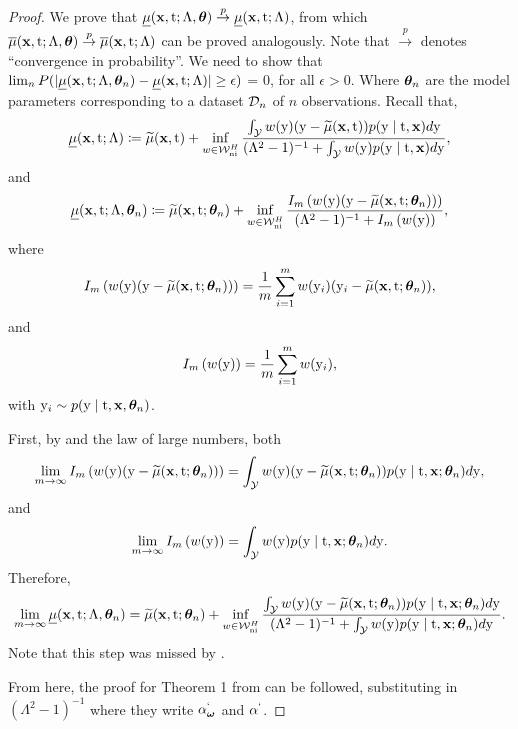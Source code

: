\begin{proof}
We prove that $\underline{\mu}(\mathbf{x}, \mathrm{t}; \Lambda, \bm{\theta}) \overset{p}{\to} \underline{\mu}(\mathbf{x}, \mathrm{t}; \Lambda)$, from which $\overline{\mu}(\mathbf{x}, \mathrm{t}; \Lambda, \bm{\theta}) \overset{p}{\to} \overline{\mu}(\mathbf{x}, \mathrm{t}; \Lambda)$ can be proved analogously. 
Note that $\overset{p}{\to}$ denotes ``convergence in probability''.
We need to show that $\lim_{n}P(| \underline{\mu}(\mathbf{x}, \mathrm{t}; \Lambda, \bm{\theta}_n) - \underline{\mu}(\mathbf{x}, \mathrm{t}; \Lambda) | \geq \epsilon)$ = 0, for all $\epsilon > 0$. 
Where $\bm{\theta}_n$ are the model parameters corresponding to a dataset $\mathcal{D}_n$ of $n$ observations.
Recall that,
\[
    \underline{\mu}(\mathbf{x}, \mathrm{t}; \Lambda) \coloneqq \widetilde{\mu}(\mathbf{x}, \mathrm{t}) + \inf_{w \in \mathcal{W}_{\textrm{ni}}^{H}} \frac{\int_{\mathcal{Y}} w(\mathrm{y}) (\mathrm{y} - \widetilde{\mu}(\mathbf{x}, \mathrm{t})) p(\mathrm{y} \mid \mathrm{t}, \mathbf{x})d\mathrm{y}}{(\Lambda^2 - 1)^{-1} + \int_{\mathcal{Y}} w(\mathrm{y})p(\mathrm{y} \mid \mathrm{t}, \mathbf{x})d\mathrm{y}},
\]
and
\[
    \underline{\mu}(\mathbf{x}, \mathrm{t}; \Lambda, \bm{\theta}_n) \coloneqq \widetilde{\mu}(\mathbf{x}, \mathrm{t}; \bm{\theta}_n) + \inf_{w \in \mathcal{W}_{\textrm{ni}}^{H}} \frac{I_m\left( w(\mathrm{y}) (\mathrm{y} - \widetilde{\mu}(\mathbf{x}, \mathrm{t}; \bm{\theta}_n)) \right)}{(\Lambda^2 - 1)^{-1} + I_m\left( w(\mathrm{y}) \right)},
\]
where 
\[
    I_m\left( w(\mathrm{y}) (\mathrm{y} - \widetilde{\mu}(\mathbf{x}, \mathrm{t}; \bm{\theta}_n)) \right) = \frac{1}{m}\sum_{i=1}^{m} w(\mathrm{y}_i) (\mathrm{y}_i - \widetilde{\mu}(\mathbf{x}, \mathrm{t}; \bm{\theta}_n)),
\] 
and 
\[
    I_m\left( w(\mathrm{y}) \right) = \frac{1}{m}\sum_{i=1}^{m} w(\mathrm{y}_i),
\]
with $\mathrm{y}_i \sim p(\mathrm{y} \mid \mathrm{t}, \mathbf{x}, \bm{\theta}_n)$.

First, by  and the law of large numbers, both
\[
    \lim_{m \to \infty} I_m\left( w(\mathrm{y}) (\mathrm{y} - \widetilde{\mu}(\mathbf{x}, \mathrm{t}; \bm{\theta}_n)) \right) = \int_{\mathcal{Y}} w(\mathrm{y})(\mathrm{y} - \widetilde{\mu}(\mathbf{x}, \mathrm{t}; \bm{\theta}_n))p(\mathrm{y} \mid \mathrm{t}, \mathbf{x}; \bm{\theta}_n)d\mathrm{y},
\]
and
\[
    \lim_{m \to \infty} I_m\left( w(\mathrm{y}) \right) = \int_{\mathcal{Y}} w(\mathrm{y})p(\mathrm{y} \mid \mathrm{t}, \mathbf{x}; \bm{\theta}_n)d\mathrm{y}.
\]
Therefore, 
\[
    \lim_{m \to \infty} \underline{\mu}(\mathbf{x}, \mathrm{t}; \Lambda, \bm{\theta}_n) = \widetilde{\mu}(\mathbf{x}, \mathrm{t}; \bm{\theta}_n) + \inf_{w \in \mathcal{W}_{\textrm{ni}}^{H}} \frac{\int_{\mathcal{Y}} w(\mathrm{y})(\mathrm{y} - \widetilde{\mu}(\mathbf{x}, \mathrm{t}; \bm{\theta}_n))p(\mathrm{y} \mid \mathrm{t}, \mathbf{x}; \bm{\theta}_n)d\mathrm{y}}{(\Lambda^2 - 1)^{-1} + \int_{\mathcal{Y}} w(\mathrm{y})p(\mathrm{y} \mid \mathrm{t}, \mathbf{x}; \bm{\theta}_n)d\mathrm{y}}.
\]
Note that this step was missed by \cite{jesson2021quantifying}.

From here, the proof for Theorem 1 from \cite{jesson2021quantifying} can be followed, substituting in $(\Lambda^2 - 1)^{-1}$ where they write $\alpha^`_{\bm{\omega}}$ and $\alpha^`$.

\end{proof}